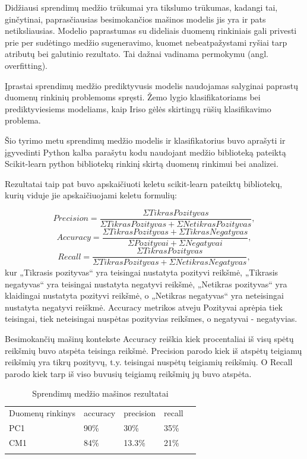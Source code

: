 \documentclass{VUMIFPSbakalaurinis}
\begin{document}
Didžiausi sprendimų medžio trūkumai yra tikslumo trūkumas, kadangi tai, ginčytinai, paprasčiausias besimokančios mašinos modelis jis yra ir pats netiksliausias. Modelio paprastumas su dideliais duomenų rinkiniais gali privesti prie per sudėtingo medžio sugeneravimo, kuomet nebeatpažystami ryšiai tarp atributų bei galutinio rezultato. Tai dažnai vadinama permokymu (angl. overfitting).

Įprastai sprendimų medžio prediktyvusis modelis naudojamas salyginai paprastų duomenų rinkinių problemoms spręsti. Žemo lygio klasifikatoriams bei prediktyviesiems modeliams, kaip Iriso gėlės skirtingų rūšių klasifikavimo problema.

Šio tyrimo metu sprendimų medžio modelis ir klasifikatorius buvo aprašyti ir įgyvedinti Python kalba parašytu kodu naudojant medžio biblioteką pateiktą Scikit-learn \cite{scikit-learn} python bibliotekų rinkinį skirtą duomenų rinkimui bei analizei.

Rezultatai taip pat buvo apskaičiuoti keletu scikit-learn pateiktų bibliotekų, kurių viduje jie apskaičiuojami keletu formulių:

\[Precision = \frac{\Sigma Tikras Pozityvas}{\Sigma Tikras Pozityvas + \Sigma Netikras Pozityvas},\]
\[Accuracy = \frac{\Sigma Tikras Pozityvas + \Sigma Tikras Negatyvas}{\Sigma Pozityvai+ \Sigma Negatyvai},\]
\[Recall = \frac{\Sigma Tikras Pozityvas}{\Sigma Tikras Pozityvas + \Sigma Netikras Negatyvas},\]
kur „Tikrasis pozityvas“ yra teisingai nustatyta pozityvi reikšmė, „Tikrasis negatyvas“ yra teisingai nustatyta negatyvi reikšmė, „Netikras pozityvas“ yra klaidingai nustatyta pozityvi reikšmė, o „Netikras negatyvas“ yra neteisingai nustatyta negatyvi reiškmė. Accuracy metrikos atveju Pozityvai aprėpia tiek teisingai, tiek neteisingai nuspėtas pozityvias reikšmes, o negatyvai - negatyvias.

Besimokančių mašinų kontekste Accuracy reiškia kiek procentaliai iš visų spėtų reikšmių buvo atspėta teisinga reikšmė. Precision parodo kiek iš atspėtų teigiamų reikšmių yra tikrų pozityvų, t.y. teisingai nuspėtų teigiamių reikšmių. O Recall parodo kiek tarp iš viso buvusių teigiamų reikšmių jų buvo atspėta.

\begin{table}[H]\footnotesize
\centering
\caption{Sprendimų medžio mašinos rezultatai}
\label{tab:Tree_result}
\begin{tabular}{lllll}
\cline{1-4}
\multicolumn{1}{|l}{Duomenų rinkinys} & accuracy & precision & \multicolumn{1}{l|}{recall} &  \\ \cline{1-4}
\multicolumn{1}{|l}{PC1}              & 90\%   & 30\%     & \multicolumn{1}{l|}{35\%} &  \\
\multicolumn{1}{|l}{CM1}              & 84\%    & 13.3\%     & \multicolumn{1}{l|}{21\%}  &  \\ \cline{1-4}
                                      &          &           &                             & 
\end{tabular}
\end{table}
\end{document}
